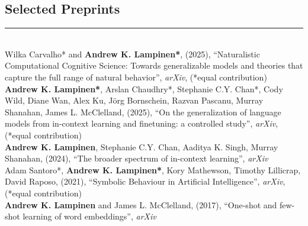 \documentclass[margin]{res}
\begin{document}
\begin{resume}
\vspace{1pt}\section{Selected\phantom{blah} Preprints} \vspace{-15pt} \rule{\textwidth}{0.5pt} \\[5pt]
Wilka Carvalho* and \textbf{Andrew K. Lampinen*}, (2025), {``Naturalistic Computational Cognitive Science: Towards generalizable models and theories that capture the full range of natural behavior''}, \textit{arXiv}, (*equal contribution)\\[5pt]
\textbf{Andrew K. Lampinen*}, Arslan Chaudhry*, Stephanie C.Y. Chan*, Cody Wild, Diane Wan, Alex Ku, Jörg Bornschein, Razvan Pascanu, Murray Shanahan, James L. McClelland, (2025), {``On the generalization of language models from in-context learning and finetuning: a controlled study'',} \textit{arXiv}, (*equal contribution)\\[5pt]
\textbf{Andrew K. Lampinen}, Stephanie C.Y. Chan, Aaditya K. Singh, Murray Shanahan, (2024), {``The broader spectrum of in-context learning''}, \textit{arXiv}\\[5pt]
Adam Santoro*, \textbf{Andrew K. Lampinen*}, Kory Mathewson, Timothy Lillicrap, David Raposo, (2021), {``Symbolic Behaviour in Artificial Intelligence'',} \textit{arXiv}, (*equal contribution) \\[5pt] 
\textbf{Andrew K. Lampinen} and James L. McClelland, (2017), {``One-shot and few-shot learning of word embeddings'',} \textit{arXiv} 


\end{resume}
\end{document}
